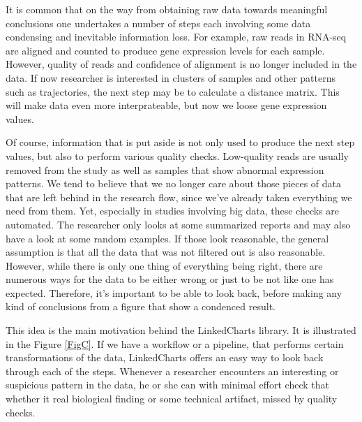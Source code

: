 \documentclass[twocolumn,10pt]{article}
\begin{document}
It is common that on the way from obtaining raw data towards meaningful conclusions one undertakes a number of steps each involving some data condensing and inevitable information loss. For example, raw reads in RNA-seq are aligned and counted to produce gene expression levels for each sample. However, quality of reads and confidence of alignment is no longer included in the data. If now researcher is interested in clusters of samples and other patterns such as trajectories, the next step may be to calculate a distance matrix. This will make data even more interprateable, but now we loose gene expression values. 

Of course, information that is put aside is not only used to produce the next step values, but also to perform various quality checks. Low-quality reads are usually removed from the study as well as samples that show abnormal expression patterns. We tend to believe that we no longer care about those pieces of data that are left behind in the research flow, since we've already taken everything we need from them. Yet, especially in studies involving big data, these checks are automated. The researcher only looks at some summarized reports and may also have a look at some random examples. If those look reasonable, the general assumption is that all the data that was not filtered out is also reasonable. However, while there is only one thing of everything being right, there are numerous ways for the data to be either wrong or just to be not like one has expected. Therefore, it's important to be able to look back, before making any kind of conclusions from a figure that show a condenced result.

This idea is the main motivation behind the LinkedCharts library. It is illustrated in the Figure \ref{FigC}. If we have a workflow or a pipeline, that performs certain transformations of the data, LinkedCharts offers an easy way to look back through each of the steps. Whenever a researcher encounters an interesting or suspicious pattern in the data, he or she can with minimal effort check that whether it real biological finding or some technical artifact, missed by quality checks. 
\end{document}
